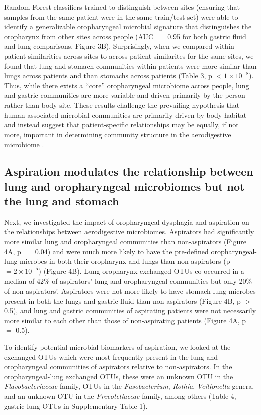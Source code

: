 \documentclass{article}
\begin{document}
Random Forest classifiers trained to distinguish between sites (ensuring that samples from the same patient were in the same train/test set) were able to identify a generalizable oropharyngeal microbial signature that distinguishes the oropharynx from other sites across people (AUC $=$ 0.95 for both gastric fluid and lung comparisons, Figure 3B).
Surprisingly, when we compared within-patient similarities across sites to across-patient similarites for the same sites, we found that lung and stomach communities within patients were more similar than lungs across patients and than stomachs across patients (Table 3, p $< 1 \times 10^{-8}$).
Thus, while there exists a ``core'' oropharyngeal microbiome across people, lung and gastric communities are more variable and driven primarily by the person rather than body site.
These results challenge the prevailing hypothesis that human-associated microbial communities are primarily driven by body habitat and instead suggest that patient-specific relationships may be equally, if not more, important in determining community structure in the aerodigestive microbiome \cite{costello2009bodysites,huttenhower2012hmp,lozupone2013bodysites}.

\FloatBarrier

\subsection{Aspiration modulates the relationship between lung and oropharyngeal microbiomes but not the lung and stomach}

Next, we investigated the impact of oropharyngeal dysphagia and aspiration on the relationships between aerodigestive microbiomes.
Aspirators had significantly more similar lung and oropharyngeal communities than non-aspirators (Figure 4A, p $=$ 0.04) and were much more likely to have the pre-defined oropharyngeal-lung microbes in both their oropharynx and lungs than non-aspirators (p $= 2 \times 10^{-5}$) (Figure 4B). 
Lung-oropharynx exchanged OTUs co-occurred in a median of 42\% of aspirators' lung and oropharyngeal communities but only 20\% of non-aspirators'.
Aspirators were not more likely to have stomach-lung microbes present in both the lungs and gastric fluid than non-aspirators (Figure 4B, p $>$ 0.5), and lung and gastric communities of aspirating patients were not necessarily more similar to each other than those of non-aspirating patients (Figure 4A, p $=$ 0.5).

To identify potential microbial biomarkers of aspiration, we looked at the exchanged OTUs which were most frequently present in the lung and oropharyngeal communities of aspirators relative to non-aspirators.
In the oropharyngeal-lung exchanged OTUs, these were an unknown OTU in the \textit{Flavobacteriaceae} family, OTUs in the \textit{Fusobacterium}, \textit{Rothia}, \textit{Veillonella} genera, and an unknown OTU in the \textit{Prevotellaceae} family, among others (Table 4, gastric-lung OTUs in Supplementary Table 1).
\end{document}
